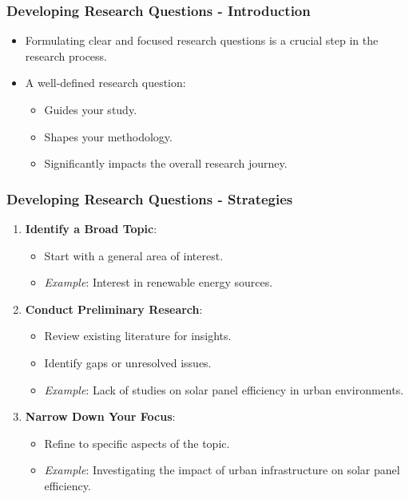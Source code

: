 \documentclass[aspectratio=169]{beamer}
\begin{document}
\begin{frame}[fragile]
    \frametitle{Developing Research Questions - Introduction}
    \begin{itemize}
        \item Formulating clear and focused research questions is a crucial step in the research process.
        \item A well-defined research question:
            \begin{itemize}
                \item Guides your study.
                \item Shapes your methodology.
                \item Significantly impacts the overall research journey.
            \end{itemize}
    \end{itemize}
\end{frame}

\begin{frame}[fragile]
    \frametitle{Developing Research Questions - Strategies}
    \begin{enumerate}
        \item \textbf{Identify a Broad Topic}:
            \begin{itemize}
                \item Start with a general area of interest.
                \item \textit{Example}: Interest in renewable energy sources.
            \end{itemize}
        \item \textbf{Conduct Preliminary Research}:
            \begin{itemize}
                \item Review existing literature for insights.
                \item Identify gaps or unresolved issues.
                \item \textit{Example}: Lack of studies on solar panel efficiency in urban environments.
            \end{itemize}
        \item \textbf{Narrow Down Your Focus}:
            \begin{itemize}
                \item Refine to specific aspects of the topic.
                \item \textit{Example}: Investigating the impact of urban infrastructure on solar panel efficiency.
            \end{itemize}
    \end{enumerate}
\end{frame}
\end{document}
